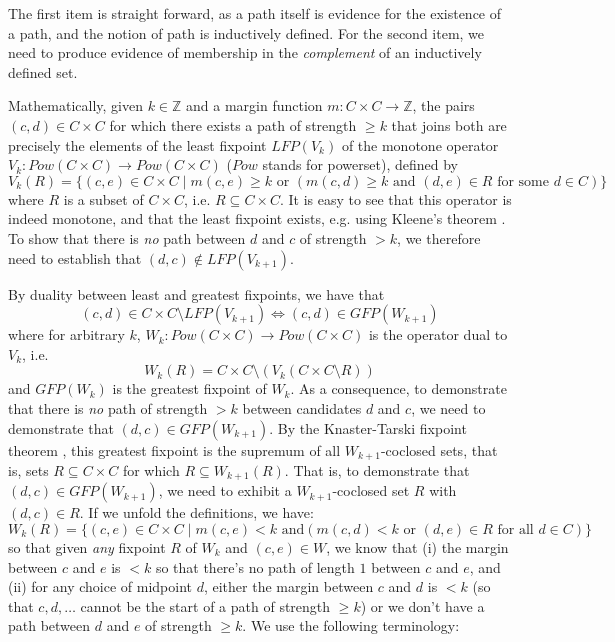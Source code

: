 \noindent
The first item is straight forward, as a path itself is evidence for the
existence of a path, and the notion of path is inductively defined.
For the second item, we need to produce evidence of membership in
the \emph{complement} of an inductively defined set.

Mathematically, given $k \in \mathbb{Z}$ and a margin function $m: C \times C
\to \mathbb{Z}$, the pairs $(c, d) \in C \times C$ for which there exists a
path of strength $\geq k$ that joins both are precisely the elements
of the least fixpoint $LFP(V_k)$ of the monotone operator $V_k:
Pow(C \times C) \to Pow(C \times C)$ ($Pow$ stands for powerset),  defined by
\[ V_k(R) = \lbrace (c, e) \in C \times C \mid m(c, e) \geq k \mbox{ or }
(m(c, d) \geq k \mbox{ and } (d, e) \in R \mbox{ for some } d \in C)
\rbrace \]
where $R$ is a subset of $C \times C$, i.e.  $R \subseteq  C \times C$. 
It is easy to see that this operator is indeed monotone, and that
the least fixpoint exists, e.g. using Kleene's theorem
\citep{Stoltenberg-Hansen:1994:MTD}.  To show that there is \emph{no}
path between $d$ and $c$ of strength $> k$, we therefore need to
establish that
$(d, c) \notin LFP(V_{k+1})$.

By duality between least and greatest fixpoints, we have that \[
(c, d) \in C \times C
\setminus LFP(V_{k+1}) \iff (c,d) \in GFP(W_{k+1}) \]
where for arbitrary $k$, $W_k: Pow(C \times C) \to Pow(C \times C)$ is the operator dual
to $V_k$, i.e.
\[ W_k(R) = C \times C \setminus (V_k (C\times C \setminus R)) \]
and $GFP(W_k)$ is the greatest fixpoint of $W_k$.
As a consequence, to demonstrate that there is \emph{no} path of
strength $> k$ between candidates $d$ and $c$, we need to
demonstrate that $(d, c) \in GFP(W_{k+1})$. By the Knaster-Tarski fixpoint
theorem \citep{Tarski:1955:LTF}, this greatest fixpoint is the supremum of all
$W_{k+1}$-coclosed sets, that is, sets $R \subseteq C \times C$ for which
$R \subseteq W_{k+1}(R)$.
That is, to demonstrate that $(d, c) \in GFP(W_{k+1})$, we need
to exhibit a $W_{k+1}$-coclosed set $R$ with $(d, c) \in R$.
If we unfold the definitions, we have:
\[ W_k(R) = \lbrace (c, e) \in C \times C \mid m(c, e) < k \mbox{ and
} (m(c, d) < k \mbox{ or } (d,e) \in R \mbox{ for all } d \in C)
\rbrace \]
so that given \emph{any} fixpoint $R$ of $W_k$ and $(c, e) \in W$, we
know that (i) the margin between $c$ and $e$ is $< k$ so that
there's no path of length $1$ between $c$ and $e$, and (ii) for any
choice of midpoint $d$, either the margin between $c$ and $d$ is $<
k$ (so that $c, d, \dots$ cannot be the start of a path of strength
$\geq k$) or we don't have a path between $d$ and $e$ of strength
$\geq k$. We use the following terminology:

